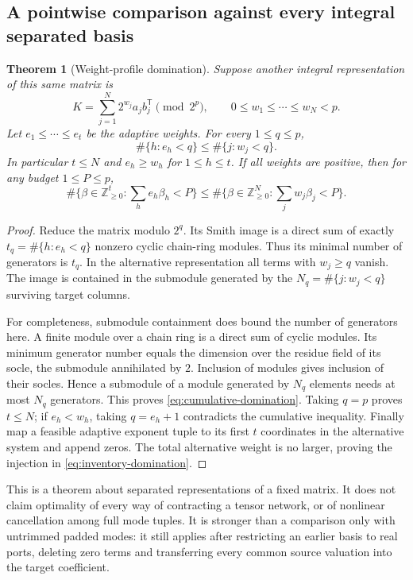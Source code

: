 \documentclass[11pt,letterpaper]{article}
\newtheorem{theorem}{Theorem}[section]
\theoremstyle{definition}\newtheorem{definition}[theorem]{Definition}
\theoremstyle{remark}\newtheorem{remark}[theorem]{Remark}
\newcommand{\NN}{\mathbb Z_{\ge0}}
\begin{document}
\subsection{A pointwise comparison against every integral separated basis}
\begin{theorem}[Weight-profile domination]\label{thm:domination}
Suppose another integral representation of this same matrix is
\[
 K=\sum_{j=1}^{N}2^{w_j}a_jb_j^{\mathsf T}\pmod{2^p},
 \qquad 0\le w_1\le\cdots\le w_N<p.
\]
Let $e_1\le\cdots\le e_t$ be the adaptive weights. For every
$1\le q\le p$,
\begin{equation}\label{eq:cumulative-domination}
 \#\{h:e_h<q\}\le\#\{j:w_j<q\}.
\end{equation}
In particular $t\le N$ and $e_h\ge w_h$ for $1\le h\le t$.
If all weights are positive, then for any budget $1\le P\le p$,
\begin{equation}\label{eq:inventory-domination}
 \#\{\beta\in\NN^t:\sum_he_h\beta_h<P\}
 \le
 \#\{\beta\in\NN^N:\sum_jw_j\beta_j<P\}.
\end{equation}
\end{theorem}
\begin{proof}
Reduce the matrix modulo $2^q$. Its Smith image is a direct sum of exactly
$t_q=\#\{h:e_h<q\}$ nonzero cyclic chain-ring modules. Thus its minimal
number of generators is $t_q$. In the alternative representation all
terms with $w_j\ge q$ vanish. The image is contained in the submodule
generated by the $N_q=\#\{j:w_j<q\}$ surviving target columns.

For completeness, submodule containment does bound the number of
generators here. A finite module over a chain ring is a direct sum of
cyclic modules. Its minimum generator number equals the dimension over
the residue field of its socle, the submodule annihilated by $2$.
Inclusion of modules gives inclusion of their socles. Hence a submodule
of a module generated by $N_q$ elements needs at most $N_q$ generators.
This proves \eqref{eq:cumulative-domination}. Taking $q=p$ proves
$t\le N$; if $e_h<w_h$, taking $q=e_h+1$ contradicts the cumulative
inequality. Finally map a feasible adaptive exponent tuple to its first
$t$ coordinates in the alternative system and append zeros. The total
alternative weight is no larger, proving the injection in
\eqref{eq:inventory-domination}.
\end{proof}

This is a theorem about separated representations of a fixed matrix.
It does not claim optimality of every way of contracting a tensor network,
or of nonlinear cancellation among full mode tuples. It is stronger than
a comparison only with untrimmed padded modes: it still applies after
restricting an earlier basis to real ports, deleting zero terms and
transferring every common source valuation into the target coefficient.
\end{document}
